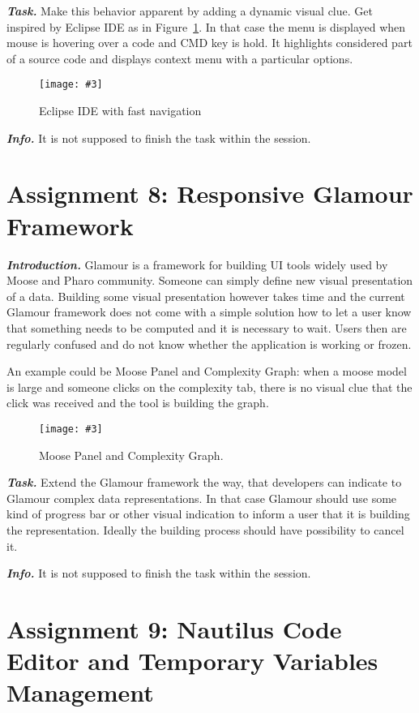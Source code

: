 \documentclass[table,a4paper]{article}
\newcommand{\figref}[1]{Figure~\ref{fig:#1}}
\newcommand{\myparagraph}[1]{\vspace{0.3em}\noindent \textbf{\textit{#1.}}}
\newcommand{\fig}[4]{
	\begin{figure}[#1]
		\centering
		\texttt{[image: \#3]}
		\caption{\label{fig:#3}#4}
	\end{figure}}
\begin{document}
\myparagraph{Task} Make this behavior apparent by adding a dynamic visual clue. Get inspired by Eclipse IDE as in \figref{eclipse-fast-navigation}. In that case the menu is displayed when mouse is hovering over a code and CMD key is hold. It highlights considered part of a source code and displays context menu with a particular options.

\fig{h}{1}{eclipse-fast-navigation}{Eclipse IDE with fast navigation}

\myparagraph{Info} It is not supposed to finish the task within the session.

\clearpage{}

\section{Assignment 8: Responsive Glamour Framework}
\label{sec:a8}

\myparagraph{Introduction} Glamour is a framework for building UI tools widely used by Moose and Pharo community. Someone can simply define new visual presentation of a data. Building some visual presentation however takes time and the current Glamour framework does not come with a simple solution how to let a user know that something needs to be computed and it is necessary to wait. Users then are regularly confused and do not know whether the application is working or frozen.

An example could be Moose Panel and Complexity Graph: when a moose model is large and someone clicks on the complexity tab, there is no visual clue that the click was received and the tool is building the graph.

\fig{h}{1}{moose-panel}{Moose Panel and Complexity Graph.}


\myparagraph{Task} Extend the Glamour framework the way, that developers can indicate to Glamour complex data representations. In that case Glamour should use some kind of progress bar or other visual indication to inform a user that it is building the representation. Ideally the building process should have possibility to cancel it.

\myparagraph{Info} It is not supposed to finish the task within the session.

\clearpage{}

\section{Assignment 9: Nautilus Code Editor and Temporary Variables Management}
\label{sec:a9}
\end{document}
